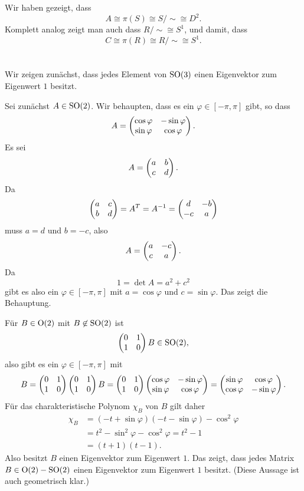 \documentclass[a4paper,10pt]{article}
\begin{document}
Wir haben gezeigt, dass
\[
 A \cong \pi(S) \cong S/{\sim} \cong D^2.
\]
Komplett analog zeigt man auch dass $R/{\sim} \cong S^1$, und damit, dass
\[
 C \cong \pi(R) \cong R/{\sim} \cong S^1.
\]


\section{}


\subsection{}
Wir zeigen zunächst, dass jedes Element von $\operatorname{SO}(3)$ einen Eigenvektor zum Eigenwert $1$ besitzt.

Sei zunächst $A \in \operatorname{SO}(2)$. Wir behaupten, dass es ein $\varphi \in [-\pi,\pi]$ gibt, so dass
\[
 A = \begin{pmatrix}\cos \varphi & -\sin \varphi \\ \sin \varphi & \cos \varphi\end{pmatrix}.
\]
Es sei
\[
 A = \begin{pmatrix}a & b \\ c & d\end{pmatrix}.
\]
Da
\[
 \begin{pmatrix}a & c \\ b & d\end{pmatrix} = A^T = A^{-1} = \begin{pmatrix}d & -b \\ -c & a\end{pmatrix}
\]
muss $a = d$ und $b = -c$, also
\[
 A= \begin{pmatrix}a & -c \\ c & a\end{pmatrix}.
\]
Da
\[
 1 = \det A = a^2 + c^2
\]
gibt es also ein $\varphi \in [-\pi,\pi]$ mit $a = \cos \varphi$ und $c = \sin \varphi$. Das zeigt die Behauptung.

Für $B \in \operatorname{O}(2)$ mit $B \not\in \operatorname{SO}(2)$ ist
\[
 \begin{pmatrix}0 & 1 \\ 1 & 0\end{pmatrix} B \in \operatorname{SO}(2),
\]
also gibt es ein $\varphi \in [-\pi,\pi]$ mit
\[
 B
 = \begin{pmatrix}0 & 1 \\ 1 & 0\end{pmatrix} \begin{pmatrix}0 & 1 \\ 1 & 0\end{pmatrix} B
 = \begin{pmatrix}0 & 1 \\ 1 & 0\end{pmatrix} \begin{pmatrix}\cos \varphi & -\sin \varphi \\ \sin \varphi & \cos \varphi\end{pmatrix}
 = \begin{pmatrix}\sin \varphi & \cos \varphi \\ \cos \varphi & -\sin \varphi\end{pmatrix}.
\]
Für das charakteristische Polynom $\chi_B$ von $B$ gilt daher
\begin{align*}
 \chi_B
 &= (-t+\sin \varphi)(-t-\sin \varphi)-\cos^2 \varphi \\
 &= t^2 - \sin^2 \varphi - \cos^2 \varphi
 = t^2 - 1 \\
 &= (t+1)(t-1).
\end{align*}
Also besitzt $B$ einen Eigenvektor zum Eigenwert $1$. Das zeigt, dass jedes Matrix $B \in \operatorname{O}(2) - \operatorname{SO}(2)$ einen Eigenvektor zum Eigenwert $1$ besitzt. (Diese Aussage ist auch geometrisch klar.)
\end{document}
